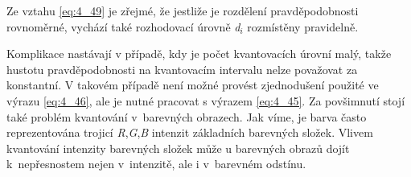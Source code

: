 Ze vztahu \eqref{eq:4_49} je zřejmé, že jestliže je rozdělení pravděpodobnosti rovnoměrné, vychází také rozhodovací úrovně \textit{d}$_i$ rozmístěny pravidelně.

Komplikace nastávají v případě, kdy je počet kvantovacích úrovní malý, takže hustotu pravděpodobnosti na kvantovacím intervalu nelze považovat za konstantní. V takovém případě není možné provést zjednodušení použité ve výrazu \eqref{eq:4_46}, ale je nutné pracovat s výrazem \eqref{eq:4_45}. Za povšimnutí stojí také problém kvantování v~barevných obrazech. Jak víme, je barva často reprezentována trojicí \textit{R},\textit{G},\textit{B} intenzit základních barevných složek. Vlivem kvantování intenzity barevných složek může u barevných obrazů dojít k~nepřesnostem nejen v~intenzitě, ale i v~barevném odstínu.
